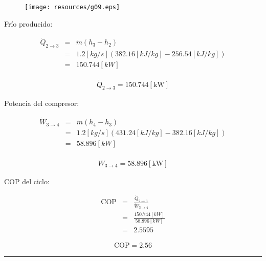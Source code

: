 \documentclass[letter,10pt]{article}
\begin{document}
\begin{enumerate}
\begin{figure}[H]
\centering
\texttt{[image: resources/g09.eps]}
\end{figure}

Frío producido:

\begin{eqnarray*}
    \dot{Q}_{2\rightarrow3} &=& \dot{m}(h_3 - h_2) \\
                            &=& 1.2[kg/s](382.16[kJ/kg]-256.54[kJ/kg]) \\
                            &=& 150.744[kW]
\end{eqnarray*}

\begin{equation*}
\boxed{
    \begin{array}{l}
        \dot{Q}_{2\rightarrow3} = 150.744[\text{kW}]
    \end{array}
}
\end{equation*}

Potencia del compresor:

\begin{eqnarray*}
    \dot{W}_{3\rightarrow4} &=& \dot{m}(h_4 - h_3) \\
                            &=& 1.2[kg/s](431.24[kJ/kg]-382.16[kJ/kg]) \\
                            &=& 58.896[kW]
\end{eqnarray*}

\begin{equation*}
\boxed{
    \begin{array}{l}
        \dot{W}_{3\rightarrow4} = 58.896[\text{kW}]
    \end{array}
}
\end{equation*}

COP del ciclo:

\begin{eqnarray*}
    \text{COP} &=& \frac{\dot{Q}_{2\rightarrow3}}{\dot{W}_{3\rightarrow4}} \\
               &=& \frac{150.744[kW]}{58.896[kW]} \\
               &=& 2.5595
\end{eqnarray*}

\begin{equation*}
\boxed{
    \begin{array}{l}
        \text{COP} = 2.56
    \end{array}
}
\end{equation*}

\noindent\rule{15.2cm}{0.4pt}


\end{enumerate}
\end{document}
